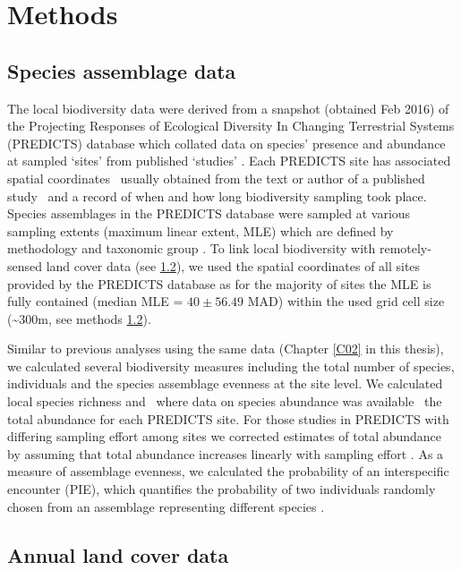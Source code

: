 \section{Methods}
\label{C04_02}
\subsection{Species assemblage data}
\label{C04_0201}

The local biodiversity data were derived from a snapshot (obtained Feb 2016) of the Projecting Responses of Ecological Diversity In Changing Terrestrial Systems (PREDICTS) database which collated data on species’ presence and abundance at sampled ‘sites’ from published ‘studies’ \citep{Hudson2016}. Each PREDICTS site has associated spatial coordinates \textendash\ usually obtained from the text or author of a published study \textendash\ and a record of when and how long biodiversity sampling took place. Species assemblages in the PREDICTS database were sampled at various sampling extents (maximum linear extent, MLE) which are defined by methodology and taxonomic group \citep{Hudson2014}. To link local biodiversity with remotely-sensed land cover data (see \ref{C04_0202}), we used the spatial coordinates of all sites provided by the PREDICTS database as for the majority of sites the MLE is fully contained (median MLE = $40 \pm 56.49$ MAD) within the used grid cell size (\textasciitilde 300m, see methods \ref{C04_0202}).   

Similar to previous analyses using the same data (\eg Chapter \ref{C02} in this thesis), we calculated several biodiversity measures including the total number of species, individuals and the species assemblage evenness at the site level. We calculated local species richness and \textendash\ where data on species abundance was available \textendash\ the total abundance for each PREDICTS site. For those studies in PREDICTS with differing sampling effort among sites we corrected estimates of total abundance by assuming that total abundance increases linearly with sampling effort \citep{Newbold2014b,Newbold2015}. As a measure of assemblage evenness, we calculated the probability of an interspecific encounter (PIE), which quantifies the probability of two individuals randomly chosen from an assemblage representing different species \citep{Hurlbert1971}. 

\subsection{Annual land cover data}
\label{C04_0202}

